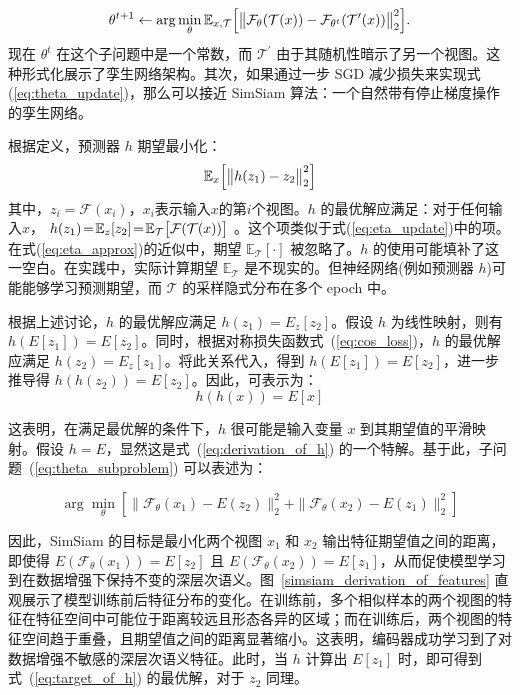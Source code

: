 \documentclass[master]{thesis-uestc}
\begin{document}
\begin{equation}
\label{eq:theta_update}
\theta^{t+1}\leftarrow\arg\min_{\theta}\mathbb{E}_{x,\mathcal{T}}\Big{[}\big{\| }\mathcal{F}_{\theta}(\mathcal{T}(x))-\mathcal{F}_{\theta^{t}}(\mathcal{T}^{ \prime}(x))\big{\|}_{2}^{2}\Big{]}.
\end{equation}
现在 $\theta^{t}$ 在这个子问题中是一个常数，而 $\mathcal{T}^{\prime}$ 由于其随机性暗示了另一个视图。这种形式化展示了孪生网络架构。其次，如果通过一步 SGD 减少损失来实现式(\ref{eq:theta_update})，那么可以接近 SimSiam 算法：一个自然带有停止梯度操作的孪生网络。

根据定义，预测器 $h$ 期望最小化：
\begin{equation}
\mathbb{E}_{x}\Big{[}\big{\|}h(z_{1})-z_{2}\big{\|}_{2}^{2}\Big{]} 
\label{eq:target_of_h}
\end{equation}
其中，$z_i = \mathcal{F}(x_i)$，$x_i$表示输入$x$的第$i$个视图。$h$ 的最优解应满足：对于任何输入$x$， $h(z_{1})\!=\!\mathbb{E}_{z}[z_{2}]\!=\!\mathbb{E}_{\mathcal{T}}\big{[}\mathcal{F}( \mathcal{T}(x))\big{]}$ 。这个项类似于式(\ref{eq:eta_update})中的项。在式(\ref{eq:eta_approx})的近似中，期望 $\mathbb{E}_{\mathcal{T}}[\cdot]$ 被忽略了。$h$ 的使用可能填补了这一空白。在实践中，实际计算期望 $\mathbb{E}_{\mathcal{T}}$ 是不现实的。但神经网络(例如预测器 $h$)可能能够学习预测期望，而 $\mathcal{T}$ 的采样隐式分布在多个 epoch 中。

根据上述讨论，$h$ 的最优解应满足 $h(z_1) = E_z[z_2]$。假设 $h$ 为线性映射，则有 $h(E[z_1]) = E[z_2]$。同时，根据对称损失函数式~(\ref{eq:cos_loss})，$h$ 的最优解应满足 $h(z_2) = E_z[z_1]$。将此关系代入，得到 $h(E[z_1]) = E[z_2]$，进一步推导得 $h(h(z_2)) = E[z_2]$。因此，可表示为：
\begin{equation}
    h(h(x)) = E[x]
    \label{eq:derivation_of_h}
\end{equation}

这表明，在满足最优解的条件下，$h$ 很可能是输入变量 $x$ 到其期望值的平滑映射。假设 $h = E$，显然这是式~(\ref{eq:derivation_of_h}) 的一个特解。基于此，子问题~(\ref{eq:theta_subproblem}) 可以表述为：

\begin{equation}
    \arg\min_{\theta} \left[\| \mathcal{F}_{\theta}(x_1) - E(z_2) \|_2^2 + \| \mathcal{F}_{\theta}(x_2) - E(z_1) \|_2^2 \right]
\end{equation}

因此，SimSiam 的目标是最小化两个视图 \( x_1 \) 和 \( x_2 \) 输出特征期望值之间的距离，即使得 \( E(\mathcal{F}_\theta(x_1)) = E[z_2] \) 且 \( E(\mathcal{F}_\theta(x_2)) = E[z_1] \)，从而促使模型学习到在数据增强下保持不变的深层次语义。图~\ref{simsiam_derivation_of_features} 直观展示了模型训练前后特征分布的变化。在训练前，多个相似样本的两个视图的特征在特征空间中可能位于距离较远且形态各异的区域；而在训练后，两个视图的特征空间趋于重叠，且期望值之间的距离显著缩小。这表明，编码器成功学习到了对数据增强不敏感的深层次语义特征。此时，当 \( h \) 计算出 \( E[z_1] \) 时，即可得到式~(\ref{eq:target_of_h}) 的最优解，对于 \( z_2 \) 同理。
\end{document}
